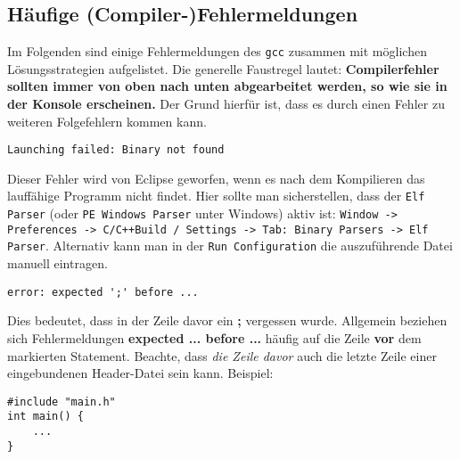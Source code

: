 
\subsection*{Häufige (Compiler-)Fehlermeldungen}

Im Folgenden sind einige Fehlermeldungen des \texttt{gcc} zusammen mit möglichen Lösungsstrategien aufgelistet.
Die generelle Faustregel lautet: 
\textbf{Compilerfehler sollten immer von oben nach unten abgearbeitet werden, so wie sie in der Konsole erscheinen.}
Der Grund hierfür ist, dass es durch einen Fehler zu weiteren Folgefehlern kommen kann.

\setlength{\leftskip}{1cm}

\begin{verbatim}
Launching failed: Binary not found
\end{verbatim}

Dieser Fehler wird von Eclipse geworfen, wenn es nach dem Kompilieren das lauffähige Programm nicht findet.
Hier sollte man sicherstellen, dass der \texttt{Elf Parser} (oder \texttt{PE Windows Parser} unter Windows) aktiv ist:
\texttt{Window -> Preferences -> C/C++Build / Settings -> Tab: Binary Parsers -> Elf Parser}. 
Alternativ kann man in der \texttt{Run Configuration} die auszuführende Datei manuell eintragen.

\begin{verbatim}
error: expected ';' before ...
\end{verbatim}

Dies bedeutet, dass in der Zeile davor ein \textbf{;} vergessen wurde.
Allgemein beziehen sich Fehlermeldungen \textbf{expected ... before ...} häufig auf die Zeile \textbf{vor} dem markierten Statement.
Beachte, dass \emph{die Zeile davor} auch die letzte Zeile einer eingebundenen Header-Datei sein kann. Beispiel:
\begin{lstlisting}[xleftmargin=1cm]
#include "main.h"
int main() {
	...
}
\end{lstlisting}

